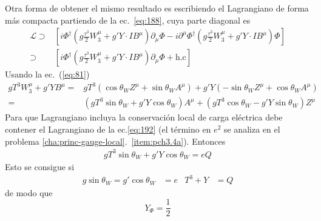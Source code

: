 Otra forma de obtener el mismo resultado es escribiendo el Lagrangiano de forma m\'as compacta partiendo de la ec.~\eqref{eq:188}, cuya
parte diagonal es
\begin{align}
  \mathcal{L}
    \supset&\left[i\Phi^\dagger\left(g\frac{\tau^3}{2}W^\mu_3+g'Y\cdot IB^\mu\right)\partial_\mu\Phi-i\partial^\mu\Phi^\dagger\left(g\frac{\tau^3}{2}W^\mu_3+g'Y\cdot IB^\mu\right)\Phi\right]\nonumber\\
    \supset&\left[i\Phi^\dagger\left(g\frac{\tau^3}{2}W^\mu_3+g'Y\cdot IB^\mu\right)\partial_\mu\Phi+\text{h.c}\right]
\end{align}
Usando la ec.~(\ref{eq:81}) 
\begin{align}
  gT^3W^\mu_3+g'YB^\mu=&gT^3(\cos\theta_WZ^\mu+\sin\theta_WA^\mu)+g'Y(-\sin\theta_WZ^\mu+\cos\theta_WA^\mu)\nonumber\\
=&\left(gT^3\sin\theta_W+g'Y\cos\theta_W\right)A^\mu+\left(gT^3\cos\theta_W-g'Y\sin\theta_W\right)Z^\mu \nonumber
\end{align}
Para que Lagrangiano incluya la conservaci\'on local de carga el\'ectrica debe contener el Lagrangiano de la ec.\eqref{eq:192} (el t\'ermino en $e^2$ se analiza en el problema \ref{cha:princ-gauge-local}.~\ref{item:pch3.4a}). Entonces
\begin{align}
  gT^3\sin\theta_W+g'Y\cos\theta_W=eQ
\end{align}
Esto se consigue si
\begin{align}
  g\sin\theta_W=g'\cos\theta_W&=e&T^3+Y&=Q
\end{align}
de modo que
\begin{equation}
  \label{eq:196}
  Y_\Phi=\frac{1}{2}
\end{equation}

